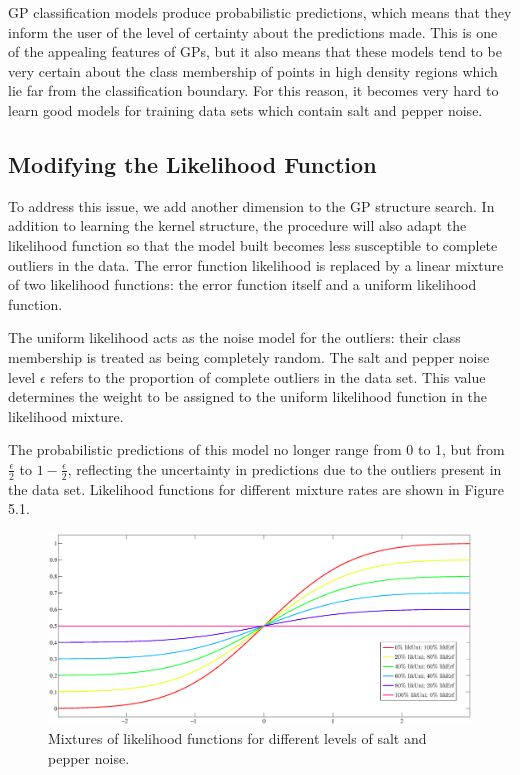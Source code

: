 \documentclass[a4paper,12pt ]{report}
\begin{document}
GP classification models produce probabilistic predictions, which means that they inform the user of the level of certainty about the predictions made. This is one of the appealing features of GPs, but it also means that these models tend to be very certain about the class membership of points in high density regions which lie far from the classification boundary. For this reason, it becomes very hard to learn good models for training data sets which contain salt and pepper noise.

\subsection{Modifying the Likelihood Function}

To address this issue, we add another dimension to the GP structure search. In addition to learning the kernel structure, the procedure will also adapt the likelihood function so that the model built becomes less susceptible to complete outliers in the data. The error function likelihood is replaced by a linear mixture of two likelihood functions: the error function itself and a uniform likelihood function.

The uniform likelihood acts as the noise model for the outliers: their class membership is treated as being completely random.  The {salt and pepper} noise level $\epsilon$ refers to the proportion of complete outliers in the data set. This value determines the weight to be assigned to the uniform likelihood function in the likelihood mixture.

The probabilistic predictions of this model no longer range from 0 to 1, but from $\frac{\epsilon}{2}$ to $1 - \frac{\epsilon}{2}$, reflecting the uncertainty in predictions due to the outliers present in the data set. Likelihood functions for different mixture rates are shown in Figure 5.1.

\begin{figure}
\caption{Mixtures of likelihood functions for different levels of salt and pepper noise.}
\begin{center}
\includegraphics[trim=0cm 0cm 0cm 0cm, width=1\textwidth] {figures/likMixPlot.eps}
\end{center}
\end{figure}
\end{document}
